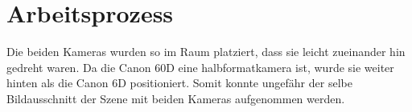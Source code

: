 %
%
%
%
%
%	
%	
%	
%	 


\section{Arbeitsprozess}


Die beiden Kameras wurden so im Raum platziert, dass sie leicht zueinander hin gedreht waren. Da die Canon 60D eine halbformatkamera ist, wurde sie weiter hinten als die Canon 6D positioniert. Somit konnte ungefähr der selbe Bildausschnitt der Szene mit beiden Kameras aufgenommen werden. \\

